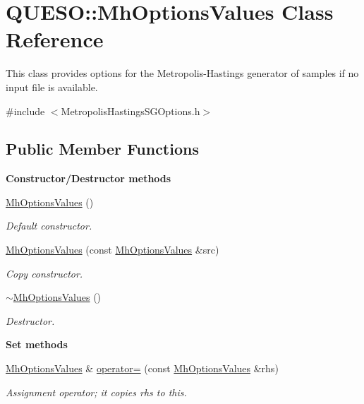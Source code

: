 \hypertarget{class_q_u_e_s_o_1_1_mh_options_values}{\section{Q\-U\-E\-S\-O\-:\-:Mh\-Options\-Values Class Reference}
\label{class_q_u_e_s_o_1_1_mh_options_values}
}


This class provides options for the Metropolis-\/\-Hastings generator of samples if no input file is available.  




{\ttfamily \#include $<$Metropolis\-Hastings\-S\-G\-Options.\-h$>$}

\subsection*{Public Member Functions}
\begin{Indent}{\bf Constructor/\-Destructor methods}\par
\begin{DoxyCompactItemize}
\item 
\hyperlink{class_q_u_e_s_o_1_1_mh_options_values_a9a76fc5a29edc4fba2e3c09f7ecf52cc}{Mh\-Options\-Values} ()
\begin{DoxyCompactList}\small\item\em Default constructor. \end{DoxyCompactList}\item 
\hyperlink{class_q_u_e_s_o_1_1_mh_options_values_af7c0a7b8b30ceeca00116e1f9fee6f2c}{Mh\-Options\-Values} (const \hyperlink{class_q_u_e_s_o_1_1_mh_options_values}{Mh\-Options\-Values} \&src)
\begin{DoxyCompactList}\small\item\em Copy constructor. \end{DoxyCompactList}\item 
\hyperlink{class_q_u_e_s_o_1_1_mh_options_values_aebd42a6c6f899ad8319ff8ddfcec88f8}{$\sim$\-Mh\-Options\-Values} ()
\begin{DoxyCompactList}\small\item\em Destructor. \end{DoxyCompactList}\end{DoxyCompactItemize}
\end{Indent}
\begin{Indent}{\bf Set methods}\par
\begin{DoxyCompactItemize}
\item 
\hyperlink{class_q_u_e_s_o_1_1_mh_options_values}{Mh\-Options\-Values} \& \hyperlink{class_q_u_e_s_o_1_1_mh_options_values_a8637ff179290b8be53e5dc3154ee9148}{operator=} (const \hyperlink{class_q_u_e_s_o_1_1_mh_options_values}{Mh\-Options\-Values} \&rhs)
\begin{DoxyCompactList}\small\item\em Assignment operator; it copies {\ttfamily rhs} to {\ttfamily this}. \end{DoxyCompactList}\end{DoxyCompactItemize}
\end{Indent}
